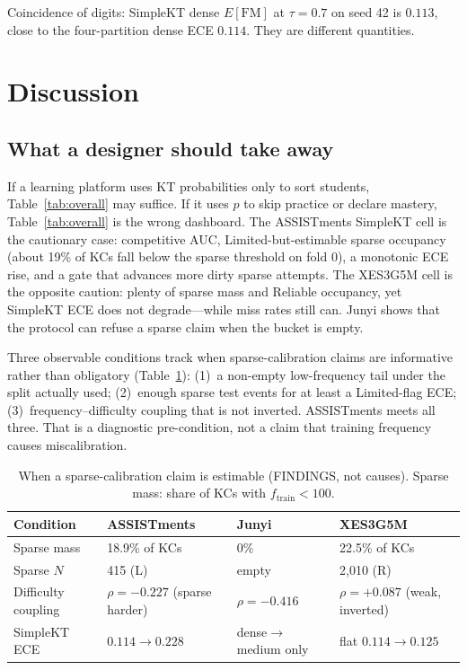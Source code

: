 \documentclass[journal,10pt,twocolumn]{IEEEtran}
\begin{document}
Coincidence of digits: SimpleKT dense $E[\mathrm{FM}]$ at $\tau=0.7$ on seed 42 is $0.113$, close to the four-partition dense ECE $0.114$. They are different quantities.

\section{Discussion}

\subsection{What a designer should take away}

If a learning platform uses KT probabilities only to sort students, Table~\ref{tab:overall} may suffice. If it uses $p$ to skip practice or declare mastery, Table~\ref{tab:overall} is the wrong dashboard. The ASSISTments SimpleKT cell is the cautionary case: competitive AUC, Limited-but-estimable sparse occupancy (about 19\% of KCs fall below the sparse threshold on fold 0), a monotonic ECE rise, and a gate that advances more dirty sparse attempts. The XES3G5M cell is the opposite caution: plenty of sparse mass and Reliable occupancy, yet SimpleKT ECE does not degrade---while miss rates still can. Junyi shows that the protocol can refuse a sparse claim when the bucket is empty.

Three observable conditions track when sparse-calibration claims are informative rather than obligatory (Table~\ref{tab:cond}): (1)~a non-empty low-frequency tail under the split actually used; (2)~enough sparse test events for at least a Limited-flag ECE; (3)~frequency--difficulty coupling that is not inverted. ASSISTments meets all three. That is a diagnostic pre-condition, not a claim that training frequency causes miscalibration.

\begin{table}[!t]
\caption{When a sparse-calibration claim is estimable (FINDINGS, not causes). Sparse mass: share of KCs with $f_{\mathrm{train}}<100$.}
\label{tab:cond}
\centering
\footnotesize
\setlength{\tabcolsep}{2.5pt}
\begin{tabular}{p{1.55cm}p{1.7cm}p{1.55cm}p{1.7cm}}
\toprule
Condition & ASSISTments & Junyi & XES3G5M \\
\midrule
Sparse mass & 18.9\% of KCs & 0\% & 22.5\% of KCs \\
Sparse $N$ & 415 (L) & empty & 2{,}010 (R) \\
Difficulty coupling & $\rho=-0.227$ (sparse harder) & $\rho=-0.416$ & $\rho=+0.087$ (weak, inverted) \\
SimpleKT ECE & $0.114\to 0.228$ & dense$\to$medium only & flat $0.114\to 0.125$ \\
\bottomrule
\end{tabular}
\end{table}
\end{document}
